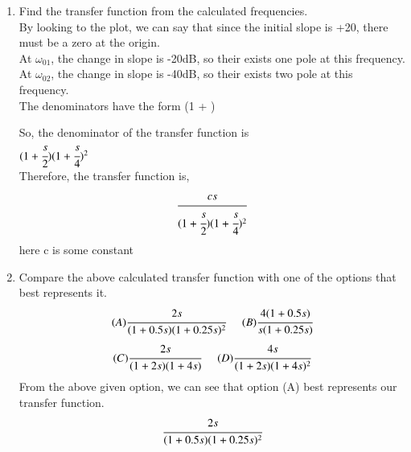 \begin{enumerate}[label=\thesection.\arabic*.,ref=\thesection.\theenumi]
\item Find the transfer function from the calculated frequencies.\\
\solution
By looking to the plot, we can say that since the initial slope is +20, there must be a zero at the origin.\\
At $\omega_{01}$, the change in slope is -20dB, so their exists one pole at this frequency.\\
At $\omega_{02}$, the change in slope is -40dB, so their exists two pole at this frequency.\\
The denominators have the form (1 + )

So, the denominator of the transfer function is\\ $(1 + \cfrac{s}{2})(1 + \cfrac{s}{4})^2$\\
Therefore, the transfer function is,
\begin{align*}
    \cfrac{cs}{(1 + \cfrac{s}{2})(1 + \cfrac{s}{4})^2} 
\end{align*}
here c is some constant\\

\item Compare the above calculated transfer function with one of the options that best represents it.
\begin{multline*}
    (A) \cfrac{2s}{(1+0.5s)(1+0.25s)^2}\hspace{0.5cm}
    (B) \cfrac{4(1+0.5s)}{s(1+0.25s)}
\end{multline*}
\begin{multline*}
    (C) \cfrac{2s}{(1+2s)(1+4s)}\hspace{0.5cm}
    (D) \cfrac{4s}{(1+2s)(1+4s)^2}
\end{multline*}
\solution
From the above given option, we can see that option (A) best represents our transfer function.
\begin{align*}
     \cfrac{2s}{(1+0.5s)(1+0.25s)^2}
\end{align*}{}


\end{enumerate}
